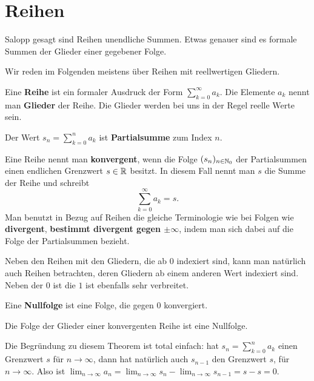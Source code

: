 \section{Reihen} 

\begin{bem} 
	Salopp gesagt sind Reihen unendliche Summen. Etwas genauer sind es formale Summen der Glieder einer gegebener Folge. 
	
	Wir reden im Folgenden meistens über Reihen mit reellwertigen Gliedern. 
\end{bem} 

\begin{defn}[Reihe] Eine \textbf{Reihe} ist ein formaler Ausdruck der Form $\sum_{k=0}^\infty a_k$. 
	Die Elemente $a_k$ nennt man \textbf{Glieder} der Reihe. Die Glieder werden bei uns in der Regel reelle Werte sein. 
	
	Der Wert $s_n = \sum_{k=0}^n a_k$ ist \textbf{Partialsumme} zum Index $n$. 
	
	Eine Reihe nennt man \textbf{konvergent}, wenn die Folge $(s_n)_{n \in \mathbb{N}_0}$ der Partialsummen einen endlichen Grenzwert $s \in \mathbb{R}$ besitzt. In diesem Fall nennt man $s$ die Summe der Reihe und schreibt 
	\[
		\sum_{k=0}^\infty a_k = s. 
	\]
	Man benutzt in Bezug auf Reihen die gleiche Terminologie wie bei Folgen wie \textbf{divergent}, \textbf{bestimmt divergent gegen $\pm \infty$}, indem man sich dabei auf die Folge der Partialsummen bezieht. 
\end{defn} 

\begin{bem}
	Neben den Reihen mit den Gliedern, die ab $0$ indexiert sind, kann man natürlich auch Reihen betrachten, deren Gliedern ab einem anderen Wert indexiert sind. Neben der $0$ ist die $1$ ist ebenfalls sehr verbreitet. 
\end{bem} 

\begin{defn} 
	Eine \textbf{Nullfolge} ist eine Folge, die gegen $0$ konvergiert. 
\end{defn} 

\begin{thm} 
	Die Folge der Glieder einer konvergenten Reihe ist eine Nullfolge. 
\end{thm} 

\begin{bem}
	Die Begründung zu diesem Theorem ist total einfach: hat $s_n = \sum_{k=0}^n a_k$ einen Grenzwert $s$ für $n \to \infty$, dann hat natürlich auch $s_{n-1}$ den Grenzwert $s$, für $n \to \infty$. Also ist $\lim_{n \to \infty} a_n = \lim_{n \to \infty} s_n - \lim_{n \to \infty} s_{n-1} = s-s = 0$. 
\end{bem} 


